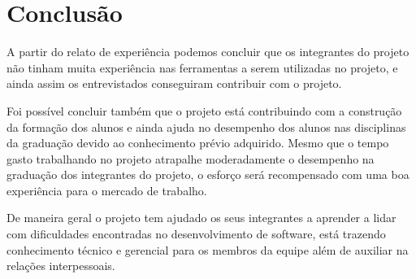 ﻿\section{Conclusão}
\label{sec:conclusao}

A partir do relato de experiência podemos concluir que os integrantes do projeto não tinham muita experiência nas ferramentas a serem utilizadas no projeto, e ainda assim os entrevistados conseguiram contribuir com o projeto.

Foi possível concluir também que o projeto está contribuindo com a construção da formação dos alunos e ainda ajuda no desempenho dos alunos nas disciplinas da graduação devido ao conhecimento prévio adquirido. Mesmo que o tempo gasto trabalhando no projeto atrapalhe moderadamente o desempenho na graduação dos integrantes do projeto, o esforço será recompensado com uma boa experiência para o mercado de trabalho.

De maneira geral o projeto tem ajudado os seus integrantes a aprender a lidar com dificuldades encontradas no desenvolvimento de software, está trazendo conhecimento técnico e gerencial para os membros da equipe além de auxiliar na relações interpessoais.